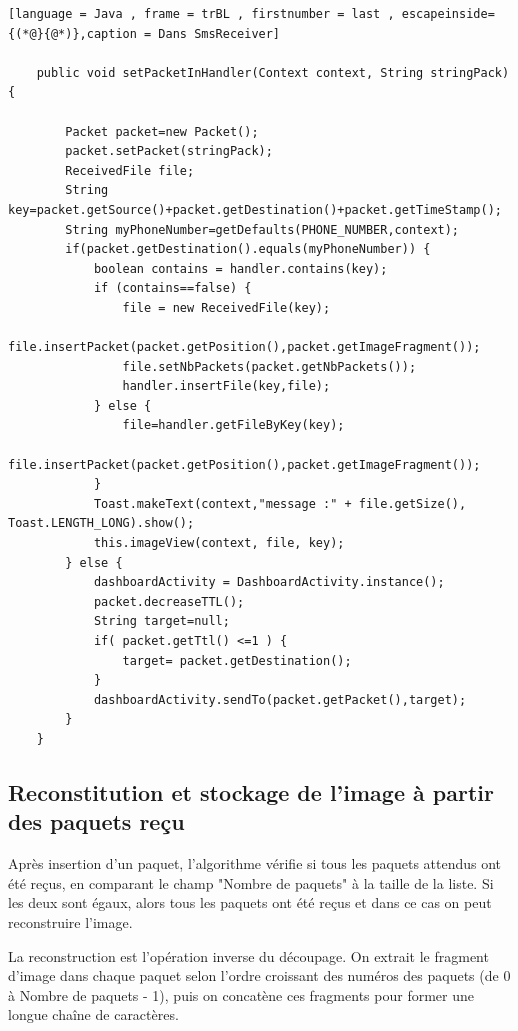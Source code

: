         \begin{lstlisting}[language = Java , frame = trBL , firstnumber = last , escapeinside={(*@}{@*)},caption = Dans SmsReceiver]

    public void setPacketInHandler(Context context, String stringPack) {

        Packet packet=new Packet();
        packet.setPacket(stringPack);
        ReceivedFile file;
        String key=packet.getSource()+packet.getDestination()+packet.getTimeStamp();
        String myPhoneNumber=getDefaults(PHONE_NUMBER,context);
        if(packet.getDestination().equals(myPhoneNumber)) {
            boolean contains = handler.contains(key);
            if (contains==false) {
                file = new ReceivedFile(key);
                file.insertPacket(packet.getPosition(),packet.getImageFragment());
                file.setNbPackets(packet.getNbPackets());
                handler.insertFile(key,file);
            } else {
                file=handler.getFileByKey(key);
                file.insertPacket(packet.getPosition(),packet.getImageFragment());
            }
            Toast.makeText(context,"message :" + file.getSize(), Toast.LENGTH_LONG).show();
            this.imageView(context, file, key);
        } else {
            dashboardActivity = DashboardActivity.instance();
            packet.decreaseTTL();
            String target=null;
            if( packet.getTtl() <=1 ) {
                target= packet.getDestination();
            }
            dashboardActivity.sendTo(packet.getPacket(),target);
        }
    }

    \end{lstlisting}
          
         \subsection{Reconstitution et stockage de l'image à partir des paquets reçu}
         Après insertion d'un paquet, l'algorithme vérifie si tous les paquets attendus ont été reçus, en comparant le champ "Nombre de paquets" à la taille de la liste. Si les deux sont égaux, alors tous les paquets ont été reçus et dans ce cas on peut reconstruire l'image. 
        
        La reconstruction est l'opération inverse du découpage. On extrait le fragment d'image dans chaque paquet selon l'ordre croissant des numéros des paquets (de 0 à Nombre de paquets - 1), puis on concatène ces fragments pour former une longue chaîne de caractères.\\
        
